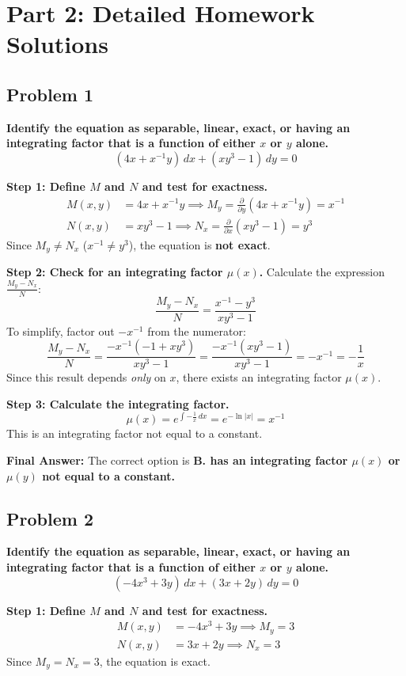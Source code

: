 \documentclass[11pt]{article}
\begin{document}
\newpage
\section*{Part 2: Detailed Homework Solutions}

\subsection*{Problem 1}
\textbf{Identify the equation as separable, linear, exact, or having an integrating factor that is a function of either $x$ or $y$ alone.}
\[ (4x + x^{-1}y) \, dx + (xy^3 - 1) \, dy = 0 \]

\textbf{Step 1: Define $M$ and $N$ and test for exactness.}
\begin{align*}
    M(x, y) &= 4x + x^{-1}y \implies M_y = \frac{\partial}{\partial y}(4x + x^{-1}y) = x^{-1} \\
    N(x, y) &= xy^3 - 1 \implies N_x = \frac{\partial}{\partial x}(xy^3 - 1) = y^3
\end{align*}
Since $M_y \neq N_x$ ($x^{-1} \neq y^3$), the equation is \textbf{not exact}.

\textbf{Step 2: Check for an integrating factor $\mu(x)$.} Calculate the expression $\frac{M_y - N_x}{N}$:
\[ \frac{M_y - N_x}{N} = \frac{x^{-1} - y^3}{xy^3 - 1} \]
To simplify, factor out $-x^{-1}$ from the numerator:
\[ \frac{M_y - N_x}{N} = \frac{-x^{-1}(-1 + xy^3)}{xy^3 - 1} = \frac{-x^{-1}(xy^3 - 1)}{xy^3 - 1} = -x^{-1} = -\frac{1}{x} \]
Since this result depends \textit{only} on $x$, there exists an integrating factor $\mu(x)$.

\textbf{Step 3: Calculate the integrating factor.}
\[ \mu(x) = e^{\int -\frac{1}{x} \, dx} = e^{-\ln|x|} = x^{-1} \]
This is an integrating factor not equal to a constant.

\textbf{Final Answer:} The correct option is \textbf{B. has an integrating factor $\mu(x)$ or $\mu(y)$ not equal to a constant.}

\hrulefill

\subsection*{Problem 2}
\textbf{Identify the equation as separable, linear, exact, or having an integrating factor that is a function of either $x$ or $y$ alone.}
\[ (-4x^3 + 3y) \, dx + (3x + 2y) \, dy = 0 \]

\textbf{Step 1: Define $M$ and $N$ and test for exactness.}
\begin{align*}
    M(x, y) &= -4x^3 + 3y \implies M_y = 3 \\
    N(x, y) &= 3x + 2y \implies N_x = 3
\end{align*}
Since $M_y = N_x = 3$, the equation is exact.
\end{document}
